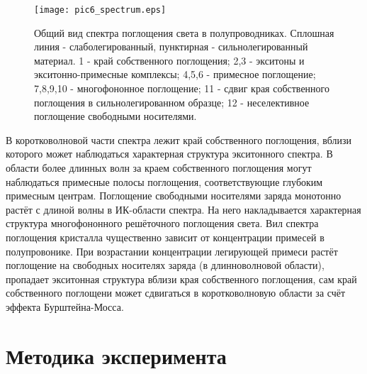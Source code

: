 \begin{figure}[h!]\centering
\texttt{[image: pic6\_spectrum.eps]}
\caption{Общий вид спектра поглощения света в полупроводниках. Сплошная линия - слаболегированный, пунктирная - сильнолегированный материал. 1 - край собственного поглощения; 2,3 - экситоны и экситонно-примесные комплексы; 4,5,6 - примесное поглощение; 7,8,9,10 - многофононное поглощение; 11 - сдвиг края собственного поглощения в сильнолегированном образце; 12 - неселективное поглощение свободными носителями.}
\label{pic6_spectrum}
\end{figure}

В коротковолновой части спектра лежит край собственного поглощения, вблизи которого может наблюдаться характерная структура экситонного спектра. В области более длинных волн за краем собственного поглощения могут наблюдаться примесные полосы поглощения, соответствующие глубоким примесным центрам. Поглощение свободными носителями заряда монотонно растёт с длиной волны в ИК-области спектра. На него накладывается характерная структура многофононного решёточного поглощения света. Вил спектра поглощения кристалла чущественно зависит от концентрации примесей в полупровонике. При возрастании концентрации легирующей примеси растёт поглощение на свободных носителях заряда (в длинноволновой области), пропадает экситонная структура вблизи края собственного поглощения, сам край собственного поглощени может сдвигаться в коротковолновую области за счёт эффекта Бурштейна-Мосса.

\section{Методика эксперимента}
